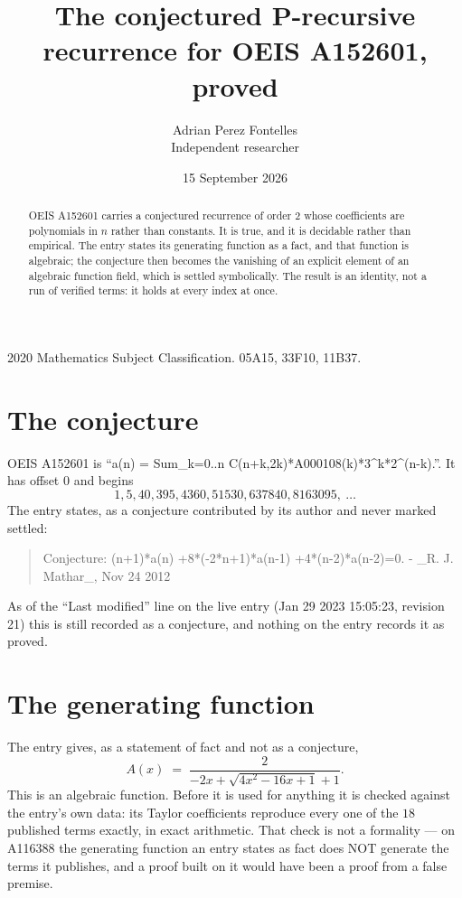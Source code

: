 \documentclass[11pt,a4paper]{article}
\title{The conjectured P-recursive recurrence for OEIS A152601, proved}
\author{Adrian Perez Fontelles\\ \small Independent researcher}
\date{15 September 2026}
\theoremstyle{plain}
\theoremstyle{definition}
\begin{document}
\maketitle

\begin{abstract}
OEIS A152601 carries a conjectured recurrence of order $2$ whose coefficients are polynomials in
$n$ rather than constants. It is true, and it is decidable rather than empirical. The entry
states its generating function as a fact, and that function is algebraic; the conjecture then
becomes the vanishing of an explicit element of an algebraic function field, which is settled
symbolically. The result is an identity, not a run of verified terms: it holds at every index
at once.
\end{abstract}

\noindent\small 2020 Mathematics Subject Classification. 05A15, 33F10, 11B37.\normalsize

\section{The conjecture}

OEIS A152601 is ``a(n) = Sum\_{k=0..n} C(n+k,2k)*A000108(k)*3\^{}k*2\^{}(n-k).''. It has offset $0$ and begins
\[
1, 5, 40, 395, 4360, 51530, 637840, 8163095,\ \dots
\]
The entry states, as a conjecture contributed by its author and never marked settled:
\begin{quote}\raggedright\small
Conjecture: (n+1)*a(n) +8*(-2*n+1)*a(n-1) +4*(n-2)*a(n-2)=0. - \_R. J. Mathar\_, Nov 24 2012
\end{quote}
As of the ``Last modified'' line on the live entry (Jan 29 2023 15:05:23, revision 21)
this is still recorded as a conjecture, and nothing on the entry records it as proved.

\section{The generating function}

The entry gives, as a statement of fact and not as a conjecture,
\[
A(x)\;=\;\frac{2}{- 2 x + \sqrt{4 x^{2} - 16 x + 1} + 1} .
\]
This is an algebraic function. Before it is used for anything it is checked against the entry's
own data: its Taylor coefficients reproduce every one of the $18$ published terms
exactly, in exact arithmetic. That check is not a formality --- on A116388 the generating
function an entry states as fact does NOT generate the terms it publishes, and a proof built on
it would have been a proof from a false premise.
\end{document}
